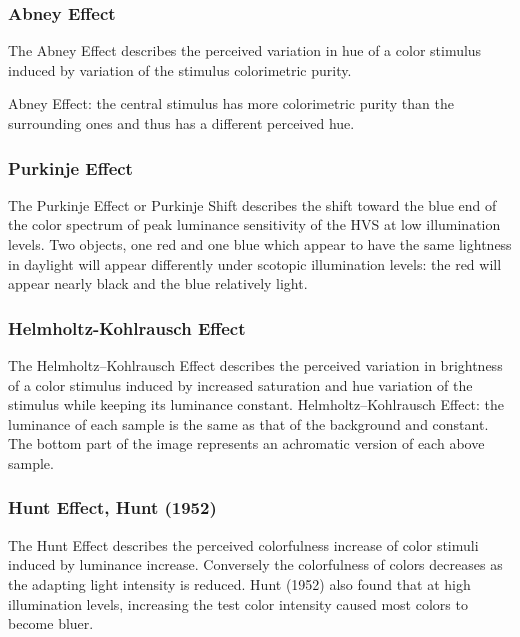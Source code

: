\subsubsection{Abney Effect}
\label{subsubsec:abney-effect}

The Abney Effect describes the perceived variation in hue of a color stimulus induced by variation of the stimulus colorimetric purity.

Abney Effect: the central stimulus has more colorimetric purity than the surrounding ones and thus has a different perceived hue.

\subsubsection{Purkinje Effect}
\label{subsubsec:purkinje-effect}

The Purkinje Effect or Purkinje Shift describes the shift toward the blue end of the color spectrum of peak luminance sensitivity of the HVS at low illumination levels.
Two objects, one red and one blue which appear to have the same lightness in daylight will appear differently under scotopic illumination levels: the red will appear nearly black and the blue relatively light.

\subsubsection{Helmholtz-Kohlrausch Effect}
\label{subsubsec:helmholtz-kohlrausch-effect}

The Helmholtz–Kohlrausch Effect describes the perceived variation in brightness of a color stimulus induced by increased saturation and hue variation of the stimulus while keeping its luminance constant.
Helmholtz–Kohlrausch Effect: the luminance of each sample is the same as that of the background and constant. The bottom part of the image represents an achromatic version of each above sample.

\subsubsection{Hunt Effect, Hunt (1952)}
\label{subsubsec:hunt-effect-hunt-1952}

The Hunt Effect describes the perceived colorfulness increase of color stimuli induced by luminance increase. Conversely the colorfulness of colors decreases as the adapting light intensity is reduced.
Hunt (1952) also found that at high illumination levels, increasing the test color intensity caused most colors to become bluer.

